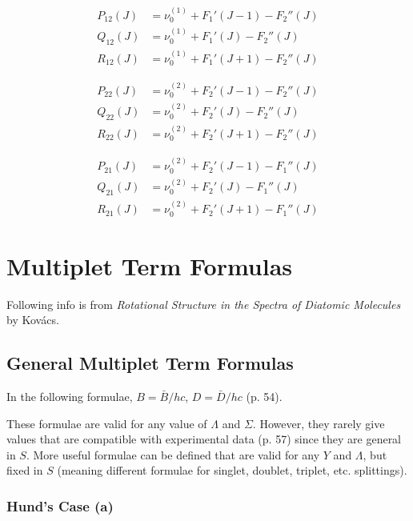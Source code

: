 \documentclass[11pt, twoside, fleqn]{report}
\begin{document}
\begin{align*}
    P_{12}(J) & = \nu_{0}^{(1)} + F_{1}'(J - 1) - F_{2}''(J) \\
    Q_{12}(J) & = \nu_{0}^{(1)} + F_{1}'(J) - F_{2}''(J)     \\
    R_{12}(J) & = \nu_{0}^{(1)} + F_{1}'(J + 1) - F_{2}''(J)
\end{align*}

\begin{align*}
    P_{22}(J) & = \nu_{0}^{(2)} + F_{2}'(J - 1) - F_{2}''(J) \\
    Q_{22}(J) & = \nu_{0}^{(2)} + F_{2}'(J) - F_{2}''(J)     \\
    R_{22}(J) & = \nu_{0}^{(2)} + F_{2}'(J + 1) - F_{2}''(J)
\end{align*}

\begin{align*}
    P_{21}(J) & = \nu_{0}^{(2)} + F_{2}'(J - 1) - F_{1}''(J) \\
    Q_{21}(J) & = \nu_{0}^{(2)} + F_{2}'(J) - F_{1}''(J)     \\
    R_{21}(J) & = \nu_{0}^{(2)} + F_{2}'(J + 1) - F_{1}''(J)
\end{align*}

\chapter{Multiplet Term Formulas}

Following info is from \textit{Rotational Structure in the Spectra of Diatomic Molecules} by Kov\'acs.

\section{General Multiplet Term Formulas}

In the following formulae, $B = \bar{B}/hc$, $D = \bar{D}/hc$ (p. 54).

These formulae are valid for any value of $\Lambda$ and $\Sigma$. However, they rarely give values that are compatible with experimental data (p. 57) since they are general in $S$. More useful formulae can be defined that are valid for any $Y$ and $\Lambda$, but fixed in $S$ (meaning different formulae for singlet, doublet, triplet, etc. splittings).

\subsection{Hund's Case (a)}
\end{document}
